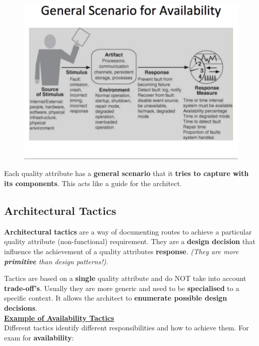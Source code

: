 \documentclass[a4paper]{article}
\begin{document}
\begin{figure}[h]
\centering 
\includegraphics[scale=0.3]{aimages/qascenario.png}
\end{figure}

Each quality attribute has a \textbf{general scenario} that it \textbf{tries to capture with its components}. This acts like a guide for the architect.

\subsection{Architectural Tactics}
\textbf{Architectural tactics} are a way of documenting routes to achieve a particular quality attribute (non-functional) requirement. They are a \textbf{design decision} that influence the achievement of a quality attributes \textbf{response}. \textit{(They are more \textbf{primitive} than design patterns!)}.

Tactics are based on a \textbf{single} quality attribute and do NOT take into account \textbf{trade-off's}. Usually they are more generic and need to be \textbf{specialised} to a specific context. It allows the architect to \textbf{enumerate possible design decisions}.\\



\underline{\textbf{Example of Availability Tactics}}\\
Different tactics identify different responsibilities and how to achieve them. For exam for \textbf{availability}: 
\end{document}
